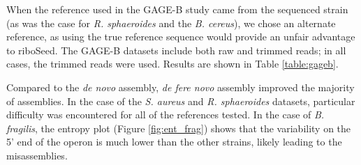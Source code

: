 \documentclass[10pt]{article}
\begin{document}
\begin{linenumbers}
When the reference used in the GAGE-B study came from the sequenced strain (as was the case for \textit{R. sphaeroides}  and  the \textit{B. cereus}), we chose an alternate reference, as using the true reference sequence would provide an unfair advantage to riboSeed. The GAGE-B datasets include both raw and trimmed reads; in all cases, the trimmed reads were used. Results are shown in Table \ref{table:gageb}.

Compared to the \textit{de novo} assembly, \textit{de fere novo} assembly improved the majority of assemblies. In the case of the \textit{S. aureus} and \textit{R. sphaeroides} datasets, particular difficulty was encountered for all of the references tested. In the case of \textit{B. fragilis}, the entropy plot (Figure \ref{fig:ent_frag}) shows that the variability on the 5' end of the operon is much lower than the other strains, likely leading to the misassemblies.


\end{linenumbers}
\end{document}
